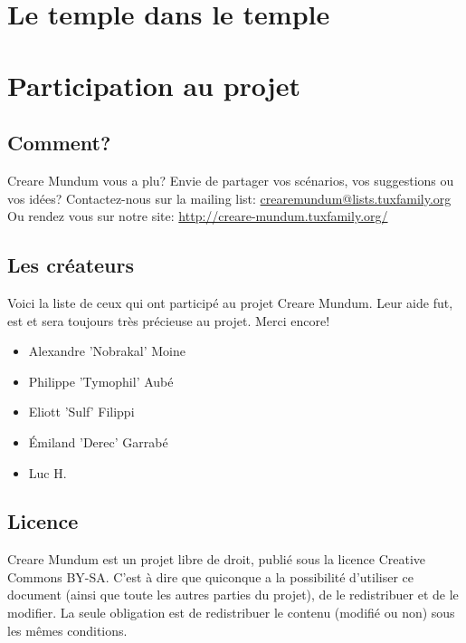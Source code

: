 \documentclass[a4paper, 11pt]{article}
\begin{document}
\section{Le temple dans le temple} 


\newpage
\section{Participation au projet}
\subsection{Comment?}
\hypertarget{participation}{}
Creare Mundum vous a plu? 
Envie de partager vos scénarios, vos suggestions ou vos idées?
\newline
Contactez-nous sur la mailing list: \href {mailto:crearemundum@lists.tuxfamily.org}{crearemundum@lists.tuxfamily.org}
\newline
Ou rendez vous sur notre site: \href {http://creare-mundum.tuxfamily.org/} {http://creare-mundum.tuxfamily.org/}
\subsection{Les créateurs}
Voici la liste de ceux qui ont participé au projet Creare Mundum. Leur aide fut, est et sera toujours très précieuse au projet. Merci encore!  
\begin{itemize}
\item Alexandre ’Nobrakal’ Moine 
\item Philippe ’Tymophil’ Aubé 
\item Eliott ’Sulf’ Filippi
\item Émiland ’Derec’ Garrabé
\item Luc H.
\end{itemize}
\subsection{Licence}
Creare Mundum est un projet libre de droit, publié sous la licence Creative Commons BY-SA. C'est à dire que quiconque a la possibilité d'utiliser ce document (ainsi que toute les autres parties du projet), de le redistribuer et de le modifier. La seule obligation est de redistribuer le contenu (modifié ou non) sous les mêmes conditions.
\end{document}
